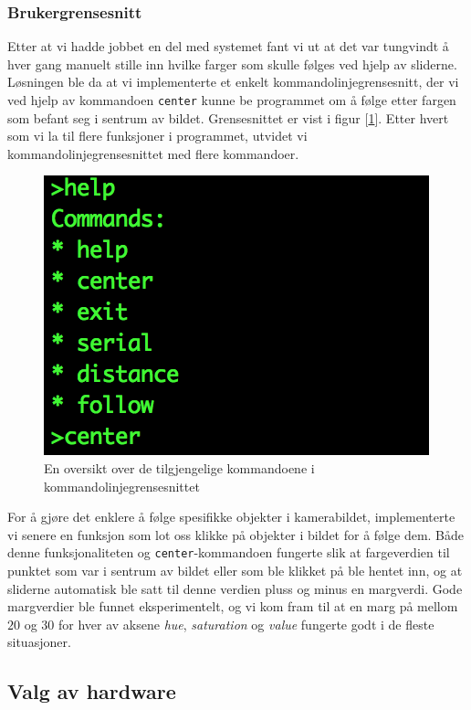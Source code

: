 \subsubsection{Brukergrensesnitt}

Etter at vi hadde jobbet en del med systemet fant vi ut at det var tungvindt å hver gang manuelt stille inn hvilke farger som skulle følges ved hjelp av sliderne. Løsningen ble da at vi implementerte et enkelt kommandolinjegrensesnitt, der vi ved hjelp av kommandoen \texttt{center} kunne be programmet om å følge etter fargen som befant seg i sentrum av bildet. Grensesnittet er vist i figur [\ref{fig:commandmenu}]. Etter hvert som vi la til flere funksjoner i programmet, utvidet vi kommandolinjegrensesnittet med flere kommandoer.

\begin{figure}[h!]
	\centering
	\includegraphics[scale=0.8]{img/command-menu.png}
	\caption{En oversikt over de tilgjengelige kommandoene i kommandolinjegrensesnittet}
	\label{fig:commandmenu}
\end{figure}

For å gjøre det enklere å følge spesifikke objekter i kamerabildet, implementerte vi senere en funksjon som lot oss klikke på objekter i bildet for å følge dem. Både denne funksjonaliteten og \texttt{center}-kommandoen fungerte slik at fargeverdien til punktet som var i sentrum av bildet eller som ble klikket på ble hentet inn, og at sliderne automatisk ble satt til denne verdien pluss og minus en margverdi. Gode margverdier ble funnet eksperimentelt, og vi kom fram til at en marg på mellom $20$ og $30$ for hver av aksene \emph{hue}, \emph{saturation} og \emph{value} fungerte godt i de fleste situasjoner.

\subsection{Valg av hardware}
